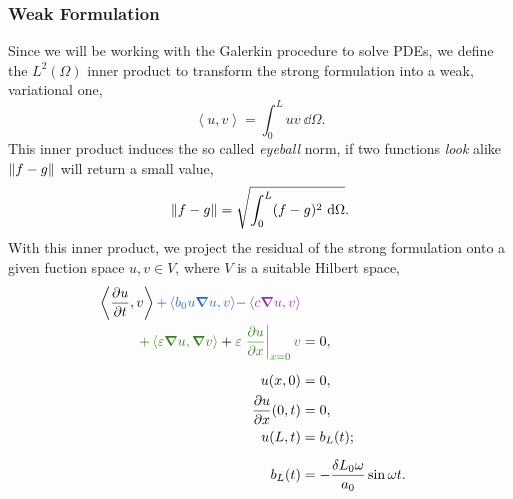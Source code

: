 \documentclass[../../thesis.tex]{subfiles}
\newcommand{\inner}[2]{\left<#1, #2\right>}
\begin{document}
\subsubsection{Weak Formulation}
Since we will be working with the Galerkin procedure to solve PDEs, 
we define the $L^2(\Omega)$ inner product to transform the strong formulation into a weak, variational one,
\begin{equation}
    \inner{u}{v} = \int_0^L uv\ \dd\Omega.
\end{equation}
This inner product induces the so called \emph{eyeball} norm, 
if two functions \textit{look} alike $\norm{f-g}$ will return a small value,
\begin{equation}
    \norm{f-g}  = \sqrt{\int_0^L (f - g)^2\ \dd\Omega}.
\end{equation}
With this inner product, we project the residual of the strong formulation onto a given fuction space 
$u, v \in V$,
where $V$ is a suitable Hilbert space,
\begin{subequations}
    \begin{align}
        \label{eq:1d_fom_weak_formulation}
        \inner{\frac{\partial u}{\partial t}}{v} 
        \textcolor{NavyBlue}{+ \inner{b_0 u \grad u}{v}}
        \textcolor{Purple}{- \inner{c \grad u}{v}} 
        \nonumber \\ 
        \textcolor{OliveGreen}{+ \inner{\varepsilon \grad u}{\grad v}} 
        + \textcolor{OliveGreen}{\varepsilon \left.\pdv{u}{x}\right|_{x=0} v}
        &= 0,  
        \\[2mm]
        u(x, 0) &= 0, 
        \\
        \pdv{u}{x} \qty(0, t) &= 0,
        \\
        u(L, t) &= b_L(t);
        \\[2mm]
        b_L(t) &= - \frac{\delta L_0 \omega}{a_0} \sin \omega t.
    \end{align}
\end{subequations}
\end{document}
